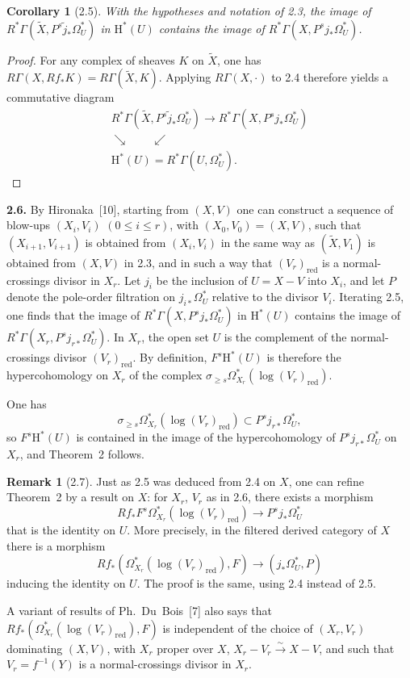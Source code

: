 \documentclass[11pt]{amsart}
\newtheorem{corollary}[theorem]{Corollary}
\theoremstyle{definition}
\newtheorem{remark}[theorem]{Remark}
\begin{document}
\begin{corollary}[2.5]
With the hypotheses and notation of \textup{2.3}, the image of $R^*\Gamma(\widetilde X,P^s\widetilde j_*\Omega_U^*)$ in $\mathrm H^*(U)$ contains the image of $R^*\Gamma(X,P^s j_*\Omega_U^*)$.
\end{corollary}

\begin{proof}
For any complex of sheaves $K$ on $\widetilde X$, one has $R\Gamma(X,Rf_*K)=R\Gamma(\widetilde X,K)$. Applying $R\Gamma(X,\cdot)$ to 2.4 therefore yields a commutative diagram
\[
\begin{array}{c}
R^*\Gamma(\widetilde X,P^s\widetilde j_*\Omega_U^*) \longrightarrow R^*\Gamma(X,P^s j_*\Omega_U^*)\\[6pt]
\searrow \qquad \swarrow\\[6pt]
\mathrm H^*(U)=R^*\Gamma(U,\Omega_U^*).
\end{array}
\]
\end{proof}

\noindent\textbf{2.6.} By Hironaka~[10], starting from $(X,V)$ one can construct a sequence of blow-ups $(X_i,V_i)$ $(0\le i\le r)$, with $(X_0,V_0)=(X,V)$, such that $(X_{i+1},V_{i+1})$ is obtained from $(X_i,V_i)$ in the same way as $(\widetilde X,V_1)$ is obtained from $(X,V)$ in 2.3, and in such a way that $(V_r)_{\mathrm{red}}$ is a normal-crossings divisor in $X_r$. Let $j_i$ be the inclusion of $U=X-V$ into $X_i$, and let $P$ denote the pole-order filtration on $j_{i*}\Omega_U^*$ relative to the divisor $V_i$. Iterating 2.5, one finds that the image of $R^*\Gamma(X,P^s j_*\Omega_U^*)$ in $\mathrm H^*(U)$ contains the image of $R^*\Gamma(X_r,P^s j_{r*}\Omega_U^*)$. In $X_r$, the open set $U$ is the complement of the normal-crossings divisor $(V_r)_{\mathrm{red}}$. By definition, $F^s\mathrm H^*(U)$ is therefore the hypercohomology on $X_r$ of the complex $\sigma_{\ge s}\Omega_{X_r}^*(\log (V_r)_{\mathrm{red}})$.

One has
\[
\sigma_{\ge s}\Omega_{X_r}^*(\log (V_r)_{\mathrm{red}}) \subset P^s j_{r*}\Omega_U^*,
\]
so $F^s\mathrm H^*(U)$ is contained in the image of the hypercohomology of $P^s j_{r*}\Omega_U^*$ on $X_r$, and Theorem~2 follows.

\begin{remark}[2.7]
Just as 2.5 was deduced from 2.4 on $X$, one can refine Theorem~2 by a result on $X$: for $X_r$, $V_r$ as in 2.6, there exists a morphism
\[
Rf_*F^s\Omega_{X_r}^*(\log (V_r)_{\mathrm{red}}) \to P^s j_*\Omega_U^*
\]
that is the identity on $U$. More precisely, in the filtered derived category of $X$ there is a morphism
\[
Rf_*(\Omega_{X_r}^*(\log (V_r)_{\mathrm{red}}),F) \to (j_*\Omega_U^*,P)
\]
inducing the identity on $U$. The proof is the same, using 2.4 instead of 2.5.

A variant of results of Ph.~Du~Bois~[7] also says that $Rf_*(\Omega_{X_r}^*(\log (V_r)_{\mathrm{red}}),F)$ is independent of the choice of $(X_r,V_r)$ dominating $(X,V)$, with $X_r$ proper over $X$, $X_r-V_r\xrightarrow{\sim} X-V$, and such that $V_r=f^{-1}(Y)$ is a normal-crossings divisor in $X_r$.
\end{remark}
\end{document}
